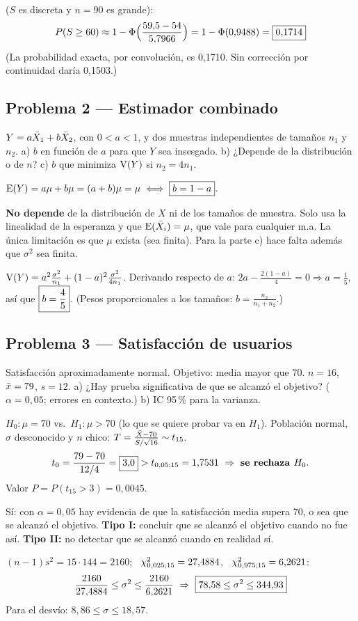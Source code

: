  ($S$ es discreta y $n=90$ es grande):
\[
P(S\ge60)\approx1-\Phi\Big(\frac{59{,}5-54}{5{,}7966}\Big)=1-\Phi(0{,}9488)=\boxed{0{,}1714}
\]
(La probabilidad exacta, por convolución, es 0,1710. Sin corrección por continuidad daría 0,1503.)

\subsection{Problema 2 --- Estimador combinado}
\begin{enun}
$Y=a\bar{X}_1+b\bar{X}_2$, con $0<a<1$, y dos muestras independientes de tamaños $n_1$ y $n_2$. a) $b$ en función de $a$ para que $Y$ sea insesgado. b) ¿Depende de la distribución o de $n$? c) $b$ que minimiza $\mathrm{V}(Y)$ si $n_2=4n_1$.
\end{enun}
 $\mathrm{E}(Y)=a\mu+b\mu=(a+b)\mu=\mu\iff\boxed{b=1-a}$.

 \textbf{No depende} de la distribución de $X$ ni de los tamaños de muestra. Solo usa la linealidad de la esperanza y que $\mathrm{E}(\bar{X}_i)=\mu$, que vale para cualquier m.a. La única limitación es que $\mu$ exista (sea finita). Para la parte c) hace falta además que $\sigma^2$ sea finita.

 $\mathrm{V}(Y)=a^2\frac{\sigma^2}{n_1}+(1-a)^2\frac{\sigma^2}{4n_1}$. Derivando respecto de $a$: $2a-\frac{2(1-a)}{4}=0\Rightarrow a=\frac15$, así que $\boxed{b=\frac45}$. (Pesos proporcionales a los tamaños: $b=\frac{n_2}{n_1+n_2}$.)

\subsection{Problema 3 --- Satisfacción de usuarios}
\begin{enun}
Satisfacción aproximadamente normal. Objetivo: media mayor que 70. $n=16$, $\bar{x}=79$, $s=12$. a) ¿Hay prueba significativa de que se alcanzó el objetivo? ($\alpha=0{,}05$; errores en contexto.) b) IC 95\,\% para la varianza.
\end{enun}
$H_0:\mu=70$ vs.\ $H_1:\mu>70$ (lo que se quiere probar va en $H_1$). Población normal, $\sigma$ desconocido y $n$ chico: $T=\frac{\bar{X}-70}{S/\sqrt{16}}\sim t_{15}$.
\[
t_0=\frac{79-70}{12/4}=\res{3{,}0}>t_{0,05;15}=1{,}7531\ \Rightarrow\ \textbf{se rechaza }H_0.
\]
Valor $P=P(t_{15}>3)=0{,}0045$.
\begin{resp}
Sí: con $\alpha=0{,}05$ hay evidencia de que la satisfacción media supera 70, o sea que se alcanzó el objetivo.
\textbf{Tipo I:} concluir que se alcanzó el objetivo cuando no fue así. \textbf{Tipo II:} no detectar que se alcanzó cuando en realidad sí.
\end{resp}
$(n-1)s^2=15\cdot144=2160$; \ $\chi^2_{0,025;15}=27{,}4884$, \ $\chi^2_{0,975;15}=6{,}2621$:
\[
\frac{2160}{27{,}4884}\le\sigma^2\le\frac{2160}{6{,}2621}\ \Rightarrow\ \res{78{,}58\le\sigma^2\le344{,}93}
\]
Para el desvío: $8{,}86\le\sigma\le18{,}57$.

